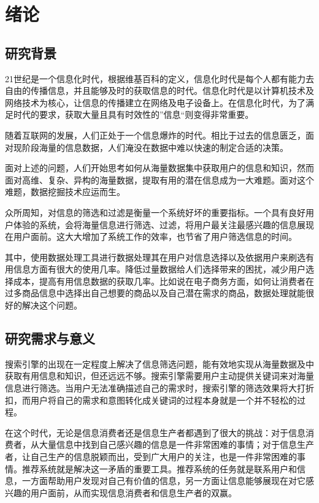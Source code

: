 \section{绪论}
\subsection{研究背景}
21世纪是一个信息化时代，根据维基百科的定义，信息化时代是每个人都有能力去自由的传播信息，并且能够及时的获取信息的时代。信息化时代是以计算机技术及网络技术为核心，让信息的传播建立在网络及电子设备上。在信息化时代，为了满足时代的要求，获取大量且具有时效性的”信息“则变得非常重要。

随着互联网的发展，人们正处于一个信息爆炸的时代。相比于过去的信息匮乏，面对现阶段海量的信息数据，人们淹没在数据中难以快速的制定合适的决策。

面对上述的问题，人们开始思考如何从海量数据集中获取用户的信息和知识，然而面对高维、复杂、异构的海量数据，提取有用的潜在信息成为一大难题。面对这个难题，数据挖掘技术应运而生。

众所周知，对信息的筛选和过滤是衡量一个系统好坏的重要指标。一个具有良好用户体验的系统，会将海量信息进行筛选、过滤，将用户最关注最感兴趣的信息展现在用户面前。这大大增加了系统工作的效率，也节省了用户筛选信息的时间。

其中，使用数据处理工具进行数据处理其在用户对信息选择以及依据用户来刷选有用信息方面有很大的使用几率。降低过量数据给人们选择带来的困扰，减少用户选择成本，提高有用信息数据的获取几率。比如说在电子商务方面，如何让消费者在过多商品信息中选择出自己想要的商品以及自己潜在需求的商品，数据处理就能很好的解决这个问题。

\subsection{研究需求与意义}
搜索引擎的出现在一定程度上解决了信息筛选问题，能有效地实现从海量数据及中获取有用信息和知识，但还远远不够。搜索引擎需要用户主动提供关键词来对海量信息进行筛选。当用户无法准确描述自己的需求时，搜索引擎的筛选效果将大打折扣，而用户将自己的需求和意图转化成关键词的过程本身就是一个并不轻松的过程。

在这个时代，无论是信息消费者还是信息生产者都遇到了很大的挑战：对于信息消费者，从大量信息中找到自己感兴趣的信息是一件非常困难的事情；对于信息生产者，让自己生产的信息脱颖而出，受到广大用户的关注，也是一件非常困难的事情。推荐系统就是解决这一矛盾的重要工具。推荐系统的任务就是联系用户和信息，一方面帮助用户发现对自己有价值的信息，另一方面让信息能够展现在对它感兴趣的用户面前，从而实现信息消费者和信息生产者的双赢。

